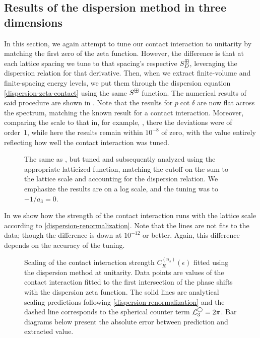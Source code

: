 
\subsection{Results of the dispersion method in three dimensions}

In this section, we again attempt to tune our contact interaction to unitarity by matching the first zero of the zeta function.
However, the difference is that at each lattice spacing we tune to that spacing's respective $S^{\boxplus}_D$, leveraging the dispersion relation for that derivative.
Then, when we extract finite-volume and finite-spacing energy levels, we put them through the dispersion equation \eqref{dispersion-zeta-contact} using the same $S^{\boxplus}$ function.
The numerical results of said procedure are shown in .
Note that the results for $p\cot\delta$ are now flat across the spectrum, matching the known result for a contact interaction.
Moreover, comparing the scale to that in, for example, , there the deviations were of order~1, while here the results remain within $10^{-8}$ of zero, with the value entirely reflecting how well the contact interaction was tuned.

\begin{figure}[!htb]
	\centering
    \scalebox{0.9}{}
    \caption{The same as , but tuned and subsequently analyzed using the appropriate latticized \Luscher function, matching the cutoff on the sum to the lattice scale and accounting for the dispersion relation.
    We emphasize the results are on a log scale, and the tuning was to $-1/a_3 = 0$.
    }
    \label{fig:unimproved dispersion}
\end{figure}

In  we show how the strength of the contact interaction runs with the lattice scale according to \eqref{dispersion-renormalization}.
Note that the lines are not fits to the data; though the difference is down at $10^{-12}$ or better.
Again, this difference depends on the accuracy of the tuning.

\begin{figure}[!htb]
	\centering
    \scalebox{0.8}{}
    \caption{
        Scaling of the contact interaction strength $C_R^{(n_s)}(\epsilon)$ fitted using the dispersion method at unitarity.
        Data points are values of the contact interaction fitted to the first intersection of the phase shifts with the dispersion zeta function.
        The solid lines are analytical scaling predictions following \eqref{dispersion-renormalization} and the dashed line corresponds to the spherical counter term $ \mathcal{L}^{\bigcirc}_3 = 2 \pi$.
        Bar diagrams below present the absolute error between prediction and extracted value.
    }
    \label{fig:dispersion running of strength}
\end{figure}

